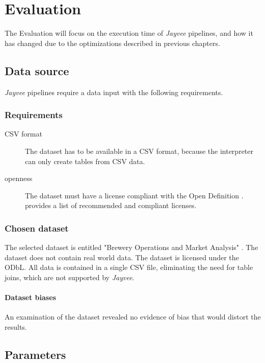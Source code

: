 \chapter{Evaluation}
\label{chapter:Evaluation}

The Evaluation will focus on the execution time of \emph{Jayvee} pipelines, and how it has changed due to the optimizations described in previous chapters.

\section{Data source}
\label{section:data_source}

\emph{Jayvee} pipelines require a data input with the following requirements.

\subsection{Requirements}
\label{subsection:data_source_requirements}
\begin{description}
	\item[\ac{CSV} format] The dataset has to be available in a \ac{CSV} format, because the interpreter can only create tables from \ac{CSV} data.
	\item[openness] The dataset must have a license compliant with the Open Definition \autocite{opendefinition}.
	      \textcite{opendefinition:licenses} provides a list of recommended and compliant licenses.
\end{description}


\subsection{Chosen dataset}
The selected dataset is entitled "Brewery Operations and Market Analysis" \autocite{dataset}.
The dataset does not contain real world data.
The dataset is licensed under the \ac{ODbL}.
All data is contained in a single \ac{CSV} file, eliminating the need for table joins, which are not supported by \emph{Jayvee}.

\subsubsection{Dataset biases}
An examination of the dataset revealed no evidence of bias that would distort the results.

\section{Parameters}
\label{section:parameters}

